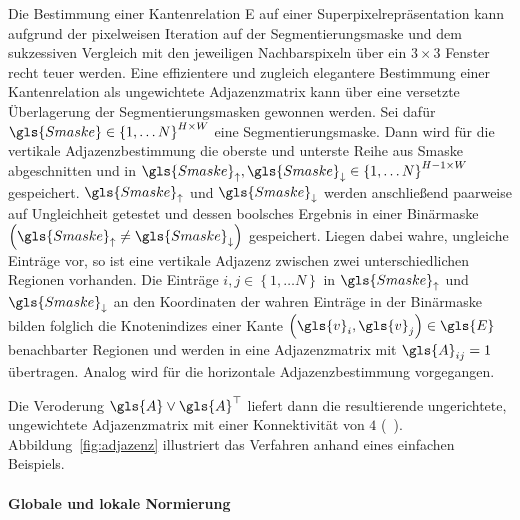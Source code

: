 Die Bestimmung einer Kantenrelation \gls{E} auf einer Superpixelrepräsentation kann aufgrund der pixelweisen Iteration auf der Segmentierungsmaske und dem sukzessiven Vergleich mit den jeweiligen Nachbarspixeln über ein $3 \times 3$ Fenster recht teuer werden.
Eine effizientere und zugleich elegantere Bestimmung einer Kantenrelation als ungewichtete Adjazenzmatrix kann über eine versetzte Überlagerung der Segmentierungsmasken gewonnen werden.
Sei dafür $\gls{Smaske} \in {\left\{1, \ldots N\right\}}^{H \times W}$ eine Segmentierungsmaske.
Dann wird für die vertikale Adjazenzbestimmung die oberste und unterste Reihe aus \gls{Smaske} abgeschnitten und in $\gls{Smaske}_{\uparrow}, \gls{Smaske}_{\downarrow} \in {\left\{1, \ldots N\right\}}^{H-1 \times W}$ gespeichert.
$\gls{Smaske}_{\uparrow}$ und $\gls{Smaske}_{\downarrow}$ werden anschließend paarweise auf Ungleichheit getestet und dessen boolsches Ergebnis in einer Binärmaske $\left(\gls{Smaske}_{\uparrow} \neq \gls{Smaske}_{\downarrow}\right)$ gespeichert.
Liegen dabei wahre, \dhe{} ungleiche Einträge vor, so ist eine vertikale Adjazenz zwischen zwei unterschiedlichen Regionen vorhanden.
Die Einträge $i,j \in \left\{1, \ldots N \right\}$ in $\gls{Smaske}_{\uparrow}$ und $\gls{Smaske}_{\downarrow}$ an den Koordinaten der wahren Einträge in der Binärmaske bilden folglich die Knotenindizes einer Kante $\left(\gls{v}_i, \gls{v}_j\right) \in \gls{E}$ benachbarter Regionen und werden in eine Adjazenzmatrix mit $\gls{A}_{ij}=1$ übertragen.
Analog wird für die horizontale Adjazenzbestimmung vorgegangen.

Die Veroderung $\gls{A} \vee \gls{A}^{\top}$ liefert dann die resultierende ungerichtete, ungewichtete Adjazenzmatrix mit einer Konnektivität von $4$ (\vgl{}~\cite{stackoverflow}).
Abbildung~\ref{fig:adjazenz} illustriert das Verfahren anhand eines einfachen Beispiels.

\paragraph{Globale und lokale Normierung}
\label{globale_lokale_normierung}

